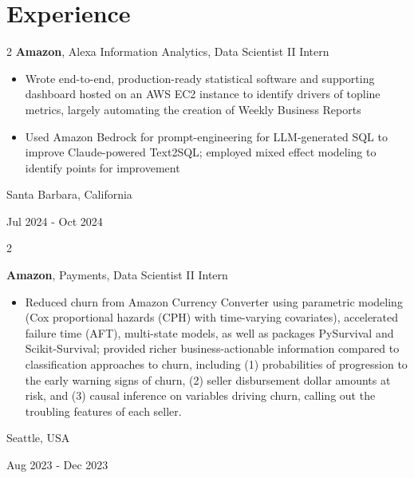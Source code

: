 \documentclass[10pt, letterpaper]{article}
\newenvironment{highlights}{
    \begin{itemize}[
        topsep=0.10 cm,
        parsep=0.10 cm,
        partopsep=0pt,
        itemsep=0pt,
        leftmargin=0.4 cm + 10pt
    ]
}{
    \end{itemize}
} %
\newenvironment{twocolentry}[2][]{
    \onecolentry
    \def\secondColumn{#2}
    \setcolumnwidth{\fill, 4.08 cm}
    \begin{paracol}{2}
}{
    \switchcolumn \raggedleft \secondColumn
    \end{paracol}
    \endonecolentry
} %
\begin{document}
    \section{Experience}

        \begin{twocolentry}{
            Santa Barbara, California

        Jul 2024 - Oct 2024

        }   \fontsize{14 pt}{20 pt}
            \textbf{Amazon}, Alexa Information Analytics, Data Scientist II Intern
            \begin{highlights}
                \item Wrote end-to-end, production-ready statistical software and supporting dashboard hosted on an AWS EC2 instance to identify drivers of topline metrics, largely automating the creation of Weekly Business Reports
                \item Used Amazon Bedrock for prompt-engineering for LLM-generated SQL to improve Claude-powered Text2SQL; employed mixed effect modeling to identify points for improvement 
            \end{highlights}
        \end{twocolentry}

        \vspace{0.2 cm}

        \begin{twocolentry}{
            Seattle, USA

        Aug 2023 - Dec 2023

        }
        \fontsize{14 pt}{20 pt}
        \textbf{Amazon}, Payments, Data Scientist II Intern
            \begin{highlights}
                \item Reduced churn from Amazon Currency Converter using parametric modeling (Cox proportional hazards (CPH) with time-varying covariates), accelerated failure time (AFT), multi-state models, as well as packages PySurvival and Scikit-Survival; provided richer business-actionable information compared to classification approaches to churn, including (1) probabilities of progression to the early warning signs of churn, (2) seller disbursement dollar amounts at risk, and (3) causal inference on variables driving churn, calling out the troubling features of each seller.

            \end{highlights}
        \end{twocolentry}
\end{document}
